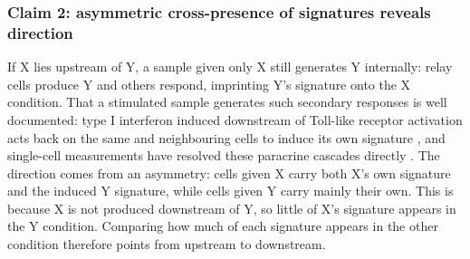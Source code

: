 \documentclass[11pt,a4paper]{article}
\begin{document}
\subsubsection{Claim 2: asymmetric cross-presence of signatures reveals direction}
\label{sec:claim-direction}
If X lies upstream of Y, a sample given only X still generates Y internally: relay cells produce Y and others respond, imprinting Y's signature onto the X condition.
That a stimulated sample generates such secondary responses is well documented: type I interferon induced downstream of Toll-like receptor activation acts back on the same and neighbouring cells to induce its own signature \citep{gautier2005type}, and single-cell measurements have resolved these paracrine cascades directly \citep{xue2015single}.
The direction comes from an asymmetry: cells given X carry both X's own signature and the induced Y signature, while cells given Y carry mainly their own. This is because X is not produced downstream of Y, so little of X's signature appears in the Y condition. Comparing how much of each signature appears in the other condition therefore points from upstream to downstream.
\end{document}
